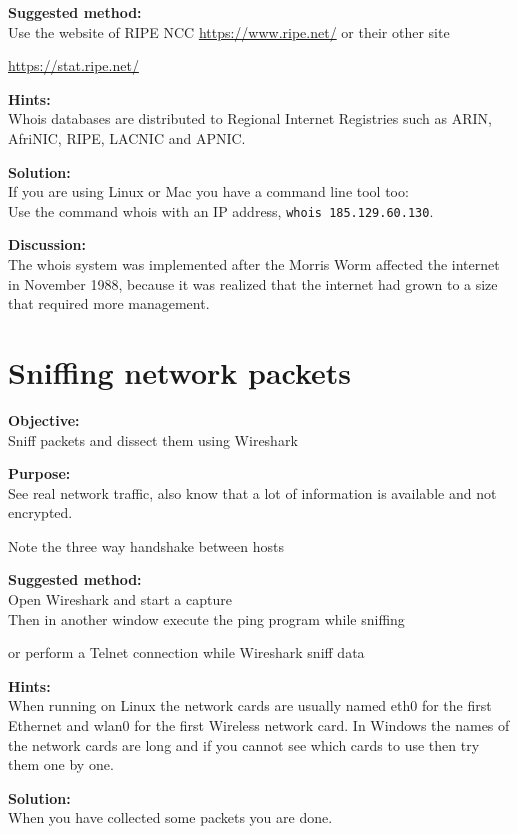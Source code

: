 \documentclass[a4paper,11pt,notitlepage]{report}
\begin{document}
{\bf Suggested method:}\\
Use the website of RIPE NCC \url{https://www.ripe.net/} or their other site

\url{https://stat.ripe.net/}

{\bf Hints:}\\
Whois databases are distributed to Regional Internet Registries such as ARIN, AfriNIC, RIPE, LACNIC and APNIC.

{\bf Solution:}\\
If you are using Linux or Mac you have a command line tool too:\\
Use the command whois with an IP address, \verb+whois 185.129.60.130+.

{\bf Discussion:}\\
The whois system was implemented after the Morris Worm affected the internet in November 1988, because it was realized that the internet had grown to a size that required more management.





\chapter{Sniffing network packets}
\label{ex:wireshark-sniff}



{\bf Objective:}\\
Sniff packets and dissect them using Wireshark

{\bf Purpose:}\\
See real network traffic, also know that a lot of information is available and not encrypted.

Note the three way handshake between hosts

{\bf Suggested method:}\\
Open Wireshark and start a capture\\
Then in another window execute the ping program while sniffing

or perform a Telnet connection while Wireshark sniff data

{\bf Hints:}\\
When running on Linux the network cards are usually named eth0 for the first Ethernet and wlan0 for the first Wireless network card. In Windows the names of the network cards are long and if you cannot see which cards to use then try them one by one.

{\bf Solution:}\\
When you have collected some packets you are done.
\end{document}
